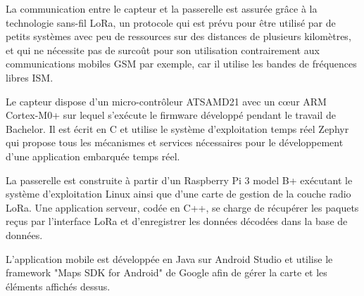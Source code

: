 \begin{normalsize}
La communication entre le capteur et la passerelle est assurée grâce à la technologie sans-fil LoRa, un protocole qui est prévu pour être utilisé par de petits systèmes avec peu de ressources sur des distances de plusieurs kilomètres, et qui ne nécessite pas de surcoût pour son utilisation contrairement aux communications mobiles GSM par exemple, car il utilise les bandes de fréquences libres ISM.

Le capteur dispose d'un micro-contrôleur ATSAMD21 avec un cœur ARM Cortex-M0+ sur lequel s'exécute le firmware développé pendant le travail de Bachelor. Il est écrit en C et utilise le système d'exploitation temps réel Zephyr qui propose tous les mécanismes et services nécessaires pour le développement d'une application embarquée temps réel.

La passerelle est construite à partir d'un Raspberry Pi 3 model B+ exécutant le système d'exploitation Linux ainsi que d'une carte de gestion de la couche radio LoRa. Une application serveur, codée en C++, se charge de récupérer les paquets reçus par l'interface LoRa et d'enregistrer les données décodées dans la base de données.

L'application mobile est développée en Java sur Android Studio et utilise le framework "Maps SDK for Android" de Google afin de gérer la carte et les éléments affichés dessus.

\end{normalsize}

